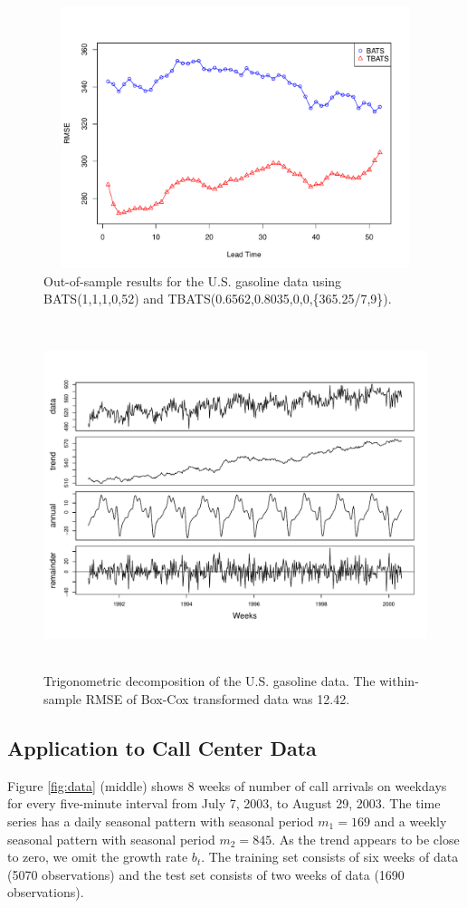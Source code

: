 \documentclass{uwstat572}
\newcommand{\vmadd}[1]{\textbf{\color{red}{#1}}}
\begin{document}
\begin{figure}[]
\centering
  \includegraphics[width=6in,height=3in]{gasRMSE.pdf}
  \caption{Out-of-sample \vmadd{prediction} results for the U.S. gasoline data using BATS(1,1,1,0,52) and TBATS(0.6562,0.8035,0,0,\{365.25/7,9\}).}
  \label{fig:gasRMSE}
\end{figure}

\begin{figure}[]
\centering
  \includegraphics[width=\linewidth,height=4in]{tbatsDecompGas.pdf}
  \caption{Trigonometric decomposition of the U.S. gasoline data. The within-sample RMSE of Box-Cox transformed data was 12.42.}
  \label{fig:tbatsDecompGas}
\end{figure}


\subsection{Application to Call Center Data}
\hspace{4ex}Figure \ref{fig:data} (middle) shows 8 weeks of number of call arrivals on weekdays for every five-minute interval from July 7, 2003, to August 29, 2003. The time series has a daily seasonal pattern with seasonal period $m_1=169$ and a weekly seasonal pattern with seasonal period $m_2=845$. As the trend appears to be close to zero, we omit the growth rate $b_t$. The training set consists of six weeks of data (5070 observations) and the test set consists of two weeks of data (1690 observations). 
\end{document}
